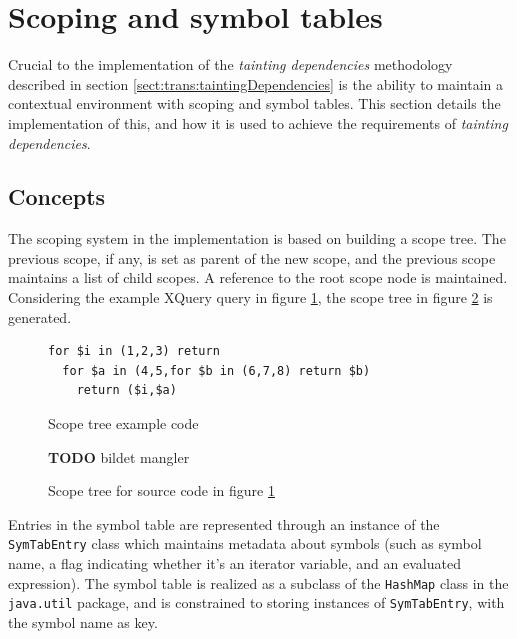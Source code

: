 \section{Scoping and symbol tables}
Crucial to the implementation of the \textit{tainting dependencies} methodology
described in section \ref{sect:trans:taintingDependencies} is the ability to
maintain a contextual environment with scoping and symbol tables. This section
details the implementation of this, and how it is used to achieve the
requirements of \textit{tainting dependencies}.

\subsection{Concepts}
The scoping system in the implementation is based on building a scope tree. The
previous scope, if any, is set as parent of the new scope, and the previous
scope maintains a list of child scopes. A reference to the root scope node is
maintained. Considering the example XQuery query in figure
\ref{fig:impl:scope_tree_ex_code}, the scope tree in figure
\ref{fig:impl:scope_tree_ex} is generated.

\begin{figure}[!htp]
\begin{center}
\begin{Verbatim}
for $i in (1,2,3) return 
  for $a in (4,5,for $b in (6,7,8) return $b) 
    return ($i,$a)
\end{Verbatim}
  \caption{Scope tree example code}
  \label{fig:impl:scope_tree_ex_code}
\end{center}
\end{figure}


\begin{figure}[!htp]
\begin{center}
  \textbf{\Large TODO} bildet mangler
  \caption{Scope tree for source code in figure
  \ref{fig:impl:scope_tree_ex_code}}
  \label{fig:impl:scope_tree_ex}
\end{center}
\end{figure}

Entries in the symbol table are represented through an instance of the
\texttt{SymTabEntry} class which maintains metadata about symbols (such as
symbol name, a flag indicating whether it's an iterator variable, and an
evaluated expression). The symbol table is realized as a subclass of the
\texttt{HashMap} class in the \texttt{java.util} package, and is constrained to
storing instances of \texttt{SymTabEntry}, with the symbol name as key.

